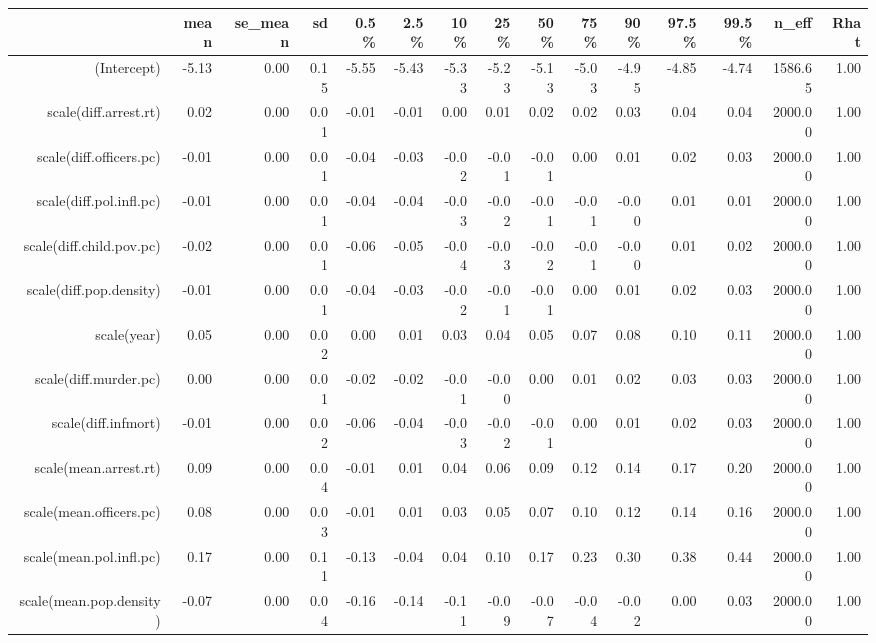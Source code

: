 \begin{table}[ht]
\centering
\begin{tabular}{rrrrrrrrrrrrrrr}
  \hline
 & mean & se\_mean & sd & 0.5\% & 2.5\% & 10\% & 25\% & 50\% & 75\% & 90\% & 97.5\% & 99.5\% & n\_eff & Rhat \\ 
  \hline
(Intercept) & -5.13 & 0.00 & 0.15 & -5.55 & -5.43 & -5.33 & -5.23 & -5.13 & -5.03 & -4.95 & -4.85 & -4.74 & 1586.65 & 1.00 \\ 
  scale(diff.arrest.rt) & 0.02 & 0.00 & 0.01 & -0.01 & -0.01 & 0.00 & 0.01 & 0.02 & 0.02 & 0.03 & 0.04 & 0.04 & 2000.00 & 1.00 \\ 
  scale(diff.officers.pc) & -0.01 & 0.00 & 0.01 & -0.04 & -0.03 & -0.02 & -0.01 & -0.01 & 0.00 & 0.01 & 0.02 & 0.03 & 2000.00 & 1.00 \\ 
  scale(diff.pol.infl.pc) & -0.01 & 0.00 & 0.01 & -0.04 & -0.04 & -0.03 & -0.02 & -0.01 & -0.01 & -0.00 & 0.01 & 0.01 & 2000.00 & 1.00 \\ 
  scale(diff.child.pov.pc) & -0.02 & 0.00 & 0.01 & -0.06 & -0.05 & -0.04 & -0.03 & -0.02 & -0.01 & -0.00 & 0.01 & 0.02 & 2000.00 & 1.00 \\ 
  scale(diff.pop.density) & -0.01 & 0.00 & 0.01 & -0.04 & -0.03 & -0.02 & -0.01 & -0.01 & 0.00 & 0.01 & 0.02 & 0.03 & 2000.00 & 1.00 \\ 
  scale(year) & 0.05 & 0.00 & 0.02 & 0.00 & 0.01 & 0.03 & 0.04 & 0.05 & 0.07 & 0.08 & 0.10 & 0.11 & 2000.00 & 1.00 \\ 
  scale(diff.murder.pc) & 0.00 & 0.00 & 0.01 & -0.02 & -0.02 & -0.01 & -0.00 & 0.00 & 0.01 & 0.02 & 0.03 & 0.03 & 2000.00 & 1.00 \\ 
  scale(diff.infmort) & -0.01 & 0.00 & 0.02 & -0.06 & -0.04 & -0.03 & -0.02 & -0.01 & 0.00 & 0.01 & 0.02 & 0.03 & 2000.00 & 1.00 \\ 
  scale(mean.arrest.rt) & 0.09 & 0.00 & 0.04 & -0.01 & 0.01 & 0.04 & 0.06 & 0.09 & 0.12 & 0.14 & 0.17 & 0.20 & 2000.00 & 1.00 \\ 
  scale(mean.officers.pc) & 0.08 & 0.00 & 0.03 & -0.01 & 0.01 & 0.03 & 0.05 & 0.07 & 0.10 & 0.12 & 0.14 & 0.16 & 2000.00 & 1.00 \\ 
  scale(mean.pol.infl.pc) & 0.17 & 0.00 & 0.11 & -0.13 & -0.04 & 0.04 & 0.10 & 0.17 & 0.23 & 0.30 & 0.38 & 0.44 & 2000.00 & 1.00 \\ 
  scale(mean.pop.density) & -0.07 & 0.00 & 0.04 & -0.16 & -0.14 & -0.11 & -0.09 & -0.07 & -0.04 & -0.02 & 0.00 & 0.03 & 2000.00 & 1.00 \\ 

\end{tabular}
\end{table}
